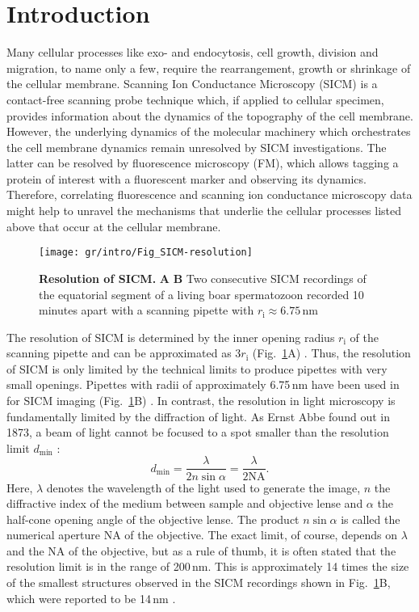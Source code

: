 \section{Introduction}
\label{sec:introduction}
Many cellular processes like exo- and endocytosis, cell growth, division and
migration, to name only a few, require the rearrangement, growth or shrinkage
of the cellular membrane. Scanning Ion Conductance Microscopy (SICM)
\cite{Hansma1989} is a contact-free scanning probe technique which, if applied
to cellular specimen, provides information about the dynamics of the
topography of the cell membrane. However, the underlying dynamics of the
molecular machinery which orchestrates the cell membrane dynamics remain
unresolved by SICM investigations. The latter can be resolved by fluorescence
microscopy (FM), which allows tagging a protein of interest with a fluorescent
marker and observing its dynamics. Therefore, correlating fluorescence and
scanning ion conductance microscopy data might help to unravel the mechanisms
that underlie the cellular processes listed above that occur at the cellular
membrane.

\begin{figure}
  \sidecaption[t]
  \texttt{[image: gr/intro/Fig\_SICM-resolution]}
  \caption{\textbf{Resolution of SICM.} \textbf{A} \textbf{B} Two
    consecutive SICM recordings of the equatorial segment of a living boar
    spermatozoon recorded 10 minutes apart with a scanning pipette with
    $r_\mathrm{i} \approx 6.75\,\text{nm}$}
  \label{fig:sicm-resolution}
\end{figure}
  
The resolution of SICM is determined by the inner opening radius
$r_\mathrm{i}$ of the scanning pipette and can be approximated as
$3r_\mathrm{i}$ (Fig.~\ref{fig:sicm-resolution}A)
\cite{rheinlaender:094905,Rheinlaender2015}.  Thus, the resolution of SICM is
only limited by the technical limits to produce pipettes with very small
openings. Pipettes with radii of approximately 6.75\,nm have been used in for
SICM imaging (Fig.~\ref{fig:sicm-resolution}B) \cite{Shevchuk2008}. In
contrast, the resolution in light microscopy is fundamentally limited by the
diffraction of light. As Ernst Abbe found out in 1873, a beam of light cannot
be focused to a spot smaller than the resolution limit $d_\text{min}$
\cite{Abbe1873}:
\begin{equation}
  d_\text{min} = \frac\lambda{2n\sin\alpha} = \frac\lambda{2\mathrm{NA}}\text{.}
  \label{eq:diffraction-limit}
\end{equation}
Here, $\lambda$ denotes the wavelength of the light used to generate the
image, $n$ the diffractive index of the medium between sample and objective
lense and $\alpha$ the half-cone opening angle of the objective lense. The
product $n\sin\alpha$ is called the numerical aperture $\mathrm{NA}$ of the
objective. The exact limit, of course, depends on $\lambda$ and the NA of the
objective, but as a rule of thumb, it is often stated that the resolution
limit is in the range of 200\,nm. This is approximately 14 times the size of
the smallest structures observed in the SICM recordings shown in
Fig.~\ref{fig:sicm-resolution}B, which were reported to be 14\,nm
\cite{Shevchuk2008}.

